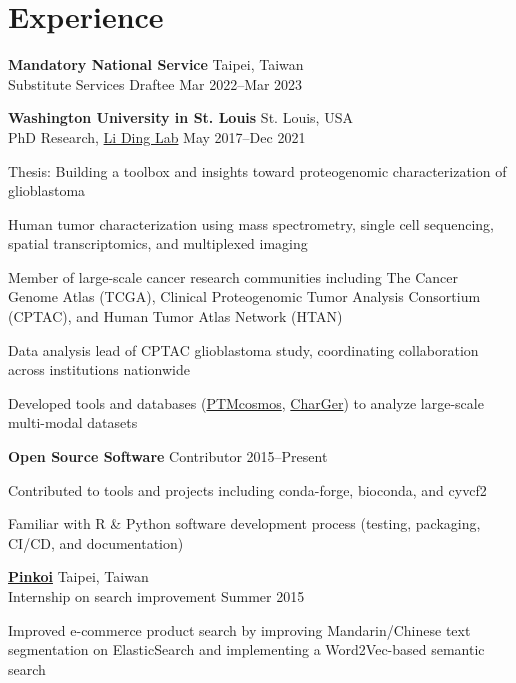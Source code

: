 \section{Experience}
\begin{entrylist}

\item \textbf{Mandatory National Service} \hfill Taipei, Taiwan\\
Substitute Services Draftee \hfill
Mar 2022--Mar 2023

\item \textbf{Washington University in St. Louis} \hfill St. Louis, USA\\
PhD Research, \href{https://dinglab.wustl.edu/}{Li Ding Lab} \hfill
May 2017--Dec 2021
\begin{detaillist}
    \item Thesis: Building a toolbox and insights toward proteogenomic characterization of glioblastoma
    \item Human tumor characterization using mass spectrometry, single cell sequencing, spatial transcriptomics, and multiplexed imaging
    \item Member of large-scale cancer research communities including The Cancer Genome Atlas (TCGA), Clinical Proteogenomic Tumor Analysis Consortium (CPTAC), and Human Tumor Atlas Network (HTAN)
    \item Data analysis lead of CPTAC glioblastoma study, coordinating collaboration across institutions nationwide
    \item Developed tools and databases (\href{https://ptmcosmos.wustl.edu/}{PTMcosmos}, \href{https://github.com/ding-lab/CharGer}{CharGer}) to analyze large-scale multi-modal datasets
\end{detaillist}

\item \textbf{Open Source Software}
Contributor \hfill 2015--Present
\begin{detaillist}
    \item Contributed to tools and projects including conda-forge, bioconda, and cyvcf2
    \item Familiar with R \& Python software development process (testing, packaging, CI/CD, and documentation)
\end{detaillist}

\item \href{http://pinkoi.com}{\textbf{Pinkoi}} \hfill Taipei, Taiwan\\
Internship on search improvement \hfill
Summer 2015
\begin{detaillist}
    \item Improved e-commerce product search by improving Mandarin/Chinese text segmentation on ElasticSearch and implementing a Word2Vec-based semantic search
\end{detaillist}


\end{entrylist}
